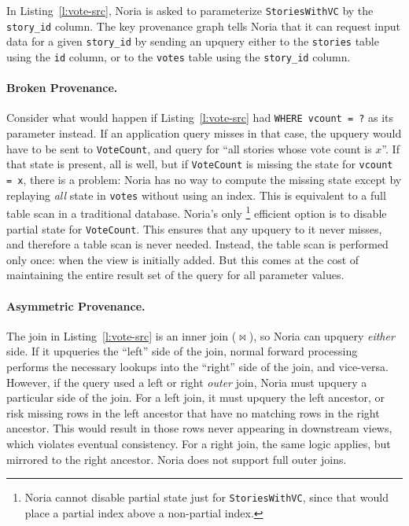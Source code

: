 In Listing~\ref{l:vote-src}, Noria is asked to parameterize
\texttt{StoriesWithVC} by the \texttt{story\_id} column. The key provenance
graph tells Noria that it can request input data for a given \texttt{story\_id}
by sending an upquery either to the \texttt{stories} table using the \texttt{id}
column, or to the \texttt{votes} table using the \texttt{story\_id} column.

\paragraph{Broken Provenance.}
Consider what would happen if Listing~\ref{l:vote-src} had \texttt{WHERE vcount
= ?} as its parameter instead. If an application query misses in that case, the
upquery would have to be sent to \texttt{VoteCount}, and query for ``all stories
whose vote count is $x$''. If that state is present, all is well, but if
\texttt{VoteCount} is missing the state for \texttt{vcount = x}, there is a
problem: Noria has no way to compute the missing state except by replaying
\emph{all} state in \texttt{votes} without using an index. This is equivalent to
a full table scan in a traditional database. Noria's only%
%
\footnote{Noria cannot disable partial state just for \texttt{StoriesWithVC},
since that would place a partial index above a non-partial index.}
%
efficient option is to disable partial
state for \texttt{VoteCount}. This ensures that any upquery to it never misses,
and therefore a table scan is never needed. Instead, the table scan is performed
only once: when the view is initially added. But this comes at the cost of
maintaining the entire result set of the query for all parameter values.

\paragraph{Asymmetric Provenance.}
The join in Listing~\ref{l:vote-src} is an inner join ($\bowtie$), so Noria can
upquery \emph{either} side. If it upqueries the ``left'' side of the join,
normal forward processing performs the necessary lookups into the ``right'' side
of the join, and vice-versa. However, if the query used a left or right
\emph{outer} join, Noria must upquery a particular side of the join. For a left
join, it must upquery the left ancestor, or risk missing rows in the left
ancestor that have no matching rows in the right ancestor. This would result in
those rows never appearing in downstream views, which violates eventual
consistency. For a right join, the same logic applies, but mirrored to the right
ancestor. Noria does not support full outer joins.

